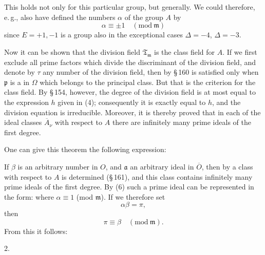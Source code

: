 
This holds not only for this particular group, but generally. We could therefore, e.\,g., also have defined the numbers $\alpha$ of the group $A$ by
\[
\alpha \equiv \pm 1 \quad (\mathrm{mod}\ \mathfrak{m})
\]
since $E = +1, -1$ is a group also in the exceptional cases $\Delta = -4$, $\Delta = -3$.

Now it can be shown that the division field $\mathfrak{T}_{\mathfrak{m}}$ is the class field for $A$. If we first exclude all prime factors which divide the discriminant of the division field, and denote by $\tau$ any number of the division field, then by \S\,160
is satisfied only when $\mathfrak{p}$ is a  in $\Omega$ which belongs to the principal class. But that is the criterion for the class field. By \S\,154, however, the degree of the division field is at most equal to the expression $h$ given in (4); consequently it is exactly equal to $h$, and the division equation is irreducible. Moreover, it is thereby proved that in each of the ideal classes $\overline{A}_\nu$ with respect to $A$ there are infinitely many prime ideals of the first degree.

One can give this theorem the following expression:

If $\beta$ is an arbitrary number in $O$, and $\mathfrak{a}$ an arbitrary ideal in $\overline{O}$, then by
a class with respect to $A$ is determined (\S\,161), and this class contains infinitely many prime ideals of the first degree. By (6) such a prime ideal can be represented in the form:
where $\alpha \equiv 1$ (mod $\mathfrak{m}$). If we therefore set
\[
\alpha\beta = \pi,
\]
then
\[
\pi \equiv \beta \quad (\mathrm{mod}\ \mathfrak{m}).
\]
From this it follows:

2. 
